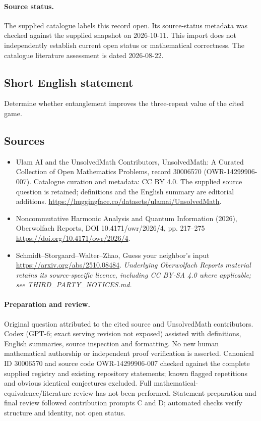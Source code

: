 \documentclass[11pt]{article}
\begin{document}
\paragraph{Source status.}
The supplied catalogue labels this record open. Its source-status metadata was checked against the supplied snapshot on 2026-10-11. This import does not independently establish current open status or mathematical correctness. The catalogue literature assessment is dated 2026-08-22.
\subsection{Short English statement}
Determine whether entanglement improves the three-repeat value of the cited game.
\subsection{Sources}
\begin{itemize}
\item[S1] Ulam AI and the UnsolvedMath Contributors, UnsolvedMath: A Curated Collection of Open Mathematics Problems, record 30006570 (OWR-14299906-007). Catalogue curation and metadata: CC BY 4.0. The supplied source question is retained; definitions and the English summary are editorial additions.
\url{https://huggingface.co/datasets/ulamai/UnsolvedMath}.
\item[S2] Noncommutative Harmonic Analysis and Quantum Information (2026), Oberwolfach Reports, DOI 10.4171/owr/2026/4, pp. 217--275
\url{https://doi.org/10.4171/owr/2026/4}.
\item[S3] Schmidt--Storgaard--Walter--Zhao, Guess your neighbor's input
\url{https://arxiv.org/abs/2510.08484}.
\textit{Underlying Oberwolfach Reports material retains its source-specific licence, including CC BY-SA 4.0 where applicable; see THIRD\_PARTY\_NOTICES.md.}
\end{itemize}
\paragraph{Preparation and review.}
Original question attributed to the cited source and UnsolvedMath contributors. Codex (GPT-6; exact serving revision not exposed) assisted with definitions, English summaries, source inspection and formatting. No new human mathematical authorship or independent proof verification is asserted. Canonical ID 30006570 and source code OWR-14299906-007 checked against the complete supplied registry and existing repository statements; known flagged repetitions and obvious identical conjectures excluded. Full mathematical-equivalence/literature review has not been performed. Statement preparation and final review followed contribution prompts C and D; automated checks verify structure and identity, not open status.
\label{end:30006570}
\end{document}
